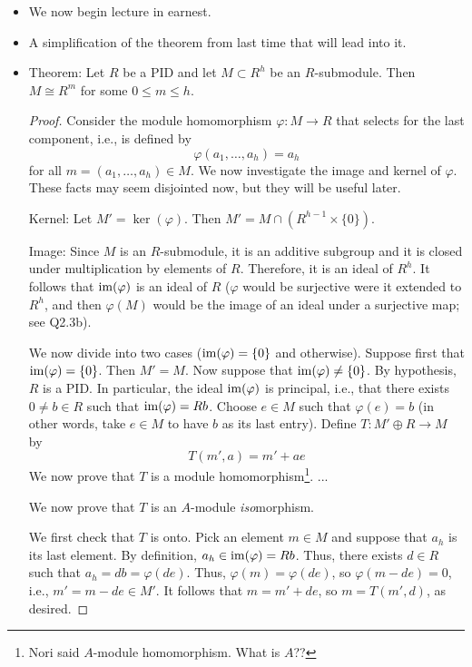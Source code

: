 \documentclass[../notes.tex]{subfiles}
\begin{document}
\begin{itemize}
\begin{itemize}
    \end{itemize}
    \item We now begin lecture in earnest.
    \item A simplification of the theorem from last time that will lead into it.
    \item Theorem: Let $R$ be a PID and let $M\subset R^h$ be an $R$-submodule. Then $M\cong R^m$ for some $0\leq m\leq h$.
    \begin{proof}
        Consider the module homomorphism $\varphi:M\to R$ that selects for the last component, i.e., is defined by
        \begin{equation*}
            \varphi(a_1,\dots,a_h) = a_h
        \end{equation*}
        for all $m=(a_1,\dots,a_h)\in M$. We now investigate the image and kernel of $\varphi$. These facts may seem disjointed now, but they will be useful later.\par
        Kernel: Let $M'=\ker(\varphi)$. Then $M'=M\cap(R^{h-1}\times\{0\})$.\par
        Image: Since $M$ is an $R$-submodule, it is an additive subgroup and it is closed under multiplication by elements of $R$. Therefore, it is an ideal of $R^h$. It follows that $\operatorname{im}(\varphi)$ is an ideal of $R$ ($\varphi$ would be surjective were it extended to $R^h$, and then $\varphi(M)$ would be the image of an ideal under a surjective map; see Q2.3b).\par
        We now divide into two cases ($\operatorname{im}(\varphi)=\{0\}$ and otherwise). Suppose first that $\operatorname{im}(\varphi)=\{0\}$. Then $M'=M$. Now suppose that $\operatorname{im}(\varphi)\neq\{0\}$. By hypothesis, $R$ is a PID. In particular, the ideal $\operatorname{im}(\varphi)$ is principal, i.e., that there exists $0\neq b\in R$ such that $\operatorname{im}(\varphi)=Rb$. Choose $e\in M$ such that $\varphi(e)=b$ (in other words, take $e\in M$ to have $b$ as its last entry). Define $T:M'\oplus R\to M$ by
        \begin{equation*}
            T(m',a) = m'+ae
        \end{equation*}
        We now prove that $T$ is a module homomorphism\footnote{Nori said $A$-module homomorphism. What is $A$??}. ...\par
        We now prove that $T$ is an $A$-module \emph{iso}morphism.\par
        We first check that $T$ is onto. Pick an element $m\in M$ and suppose that $a_h$ is its last element. By definition, $a_h\in\operatorname{im}(\varphi)=Rb$. Thus, there exists $d\in R$ such that $a_h=db=\varphi(de)$. Thus, $\varphi(m)=\varphi(de)$, so $\varphi(m-de)=0$, i.e., $m'=m-de\in M'$. It follows that $m=m'+de$, so $m=T(m',d)$, as desired.\par

\end{proof}
\end{itemize}
\end{document}
